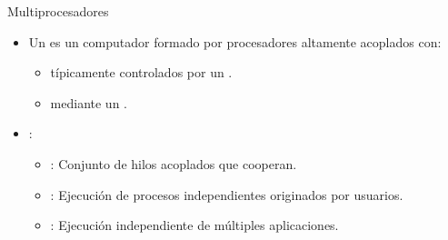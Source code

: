 \begin{frame}[t]{Multiprocesadores}
\begin{itemize}
  \item Un  es un computador formado por procesadores altamente acoplados con:
    \begin{itemize}
      \item \pause{} típicamente controlados 
            por un .
      \item {} mediante un 
            .
    \end{itemize}

  \item {}:
    \begin{itemize}
      \item \pause{}: Conjunto de hilos acoplados que cooperan.
      \item \pause{}: Ejecución de procesos independientes originados por usuarios.
      \item \pause{}: Ejecución independiente de múltiples aplicaciones.
    \end{itemize}

\end{itemize}
\end{frame}


